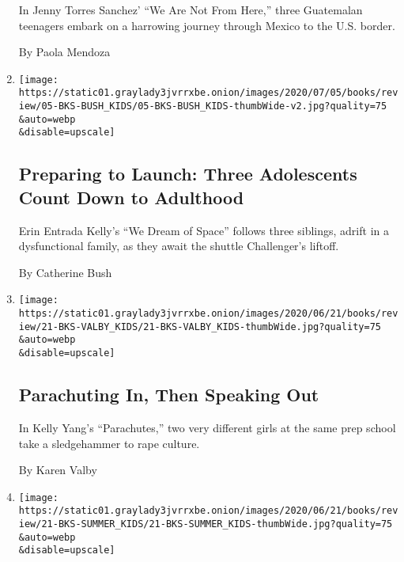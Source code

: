 \begin{enumerate}
  In Jenny Torres Sanchez' ``We Are Not From Here,'' three Guatemalan
  teenagers embark on a harrowing journey through Mexico to the U.S.
  border.

  By Paola Mendoza
\item
  \href{/2020/06/27/books/review/erin-entrada-kelly-we-dream-of-space.html}{}

  \texttt{[image: https://static01.graylady3jvrrxbe.onion/images/2020/07/05/books/review/05-BKS-BUSH\_KIDS/05-BKS-BUSH\_KIDS-thumbWide-v2.jpg?quality=75\\\&auto=webp\\\&disable=upscale]}

  \hypertarget{preparing-to-launch-three-adolescents-count-down-to-adulthood}{%
  \subsection{Preparing to Launch: Three Adolescents Count Down to
  Adulthood}\label{preparing-to-launch-three-adolescents-count-down-to-adulthood}}

  Erin Entrada Kelly's ``We Dream of Space'' follows three siblings,
  adrift in a dysfunctional family, as they await the shuttle
  Challenger's liftoff.

  By Catherine Bush
\item
  \href{/2020/06/12/books/review/kelly-yang-parachutes.html}{}

  \texttt{[image: https://static01.graylady3jvrrxbe.onion/images/2020/06/21/books/review/21-BKS-VALBY\_KIDS/21-BKS-VALBY\_KIDS-thumbWide.jpg?quality=75\\\&auto=webp\\\&disable=upscale]}

  \hypertarget{parachuting-in-then-speaking-out}{%
  \subsection{Parachuting In, Then Speaking
  Out}\label{parachuting-in-then-speaking-out}}

  In Kelly Yang's ``Parachutes,'' two very different girls at the same
  prep school take a sledgehammer to rape culture.

  By Karen Valby
\item
  \href{/2020/06/12/books/review/candace-bushnell-katie-cotugno-rules-for-being-a-girl.html}{}

  \texttt{[image: https://static01.graylady3jvrrxbe.onion/images/2020/06/21/books/review/21-BKS-SUMMER\_KIDS/21-BKS-SUMMER\_KIDS-thumbWide.jpg?quality=75\\\&auto=webp\\\&disable=upscale]}

  \hypertarget{crushing-a-schoolgirls-beloved-teacher-crosses-the-line}{%
}
\end{enumerate}
